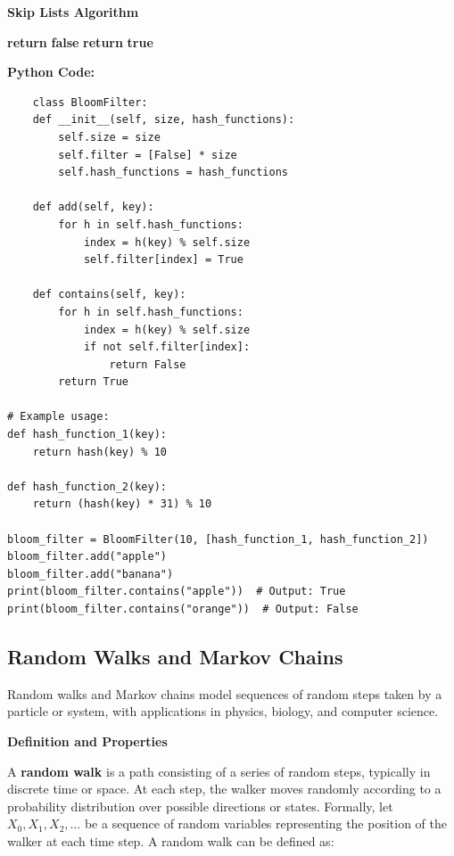 \documentclass[12pt]{book} %
\begin{document}
\textbf{Skip Lists Algorithm}
\FloatBarrier
\begin{algorithm}[H]
\caption{Bloom Filter Membership Test}
\begin{algorithmic}[1]
            \State \textbf{return} \textbf{false}
        \EndIf
    \EndFor
    \State \textbf{return} \textbf{true}
\EndFunction
\end{algorithmic}
\end{algorithm}
\FloatBarrier
\textbf{Python Code:}
\FloatBarrier
\begin{lstlisting}
    class BloomFilter:
    def __init__(self, size, hash_functions):
        self.size = size
        self.filter = [False] * size
        self.hash_functions = hash_functions

    def add(self, key):
        for h in self.hash_functions:
            index = h(key) % self.size
            self.filter[index] = True

    def contains(self, key):
        for h in self.hash_functions:
            index = h(key) % self.size
            if not self.filter[index]:
                return False
        return True

# Example usage:
def hash_function_1(key):
    return hash(key) % 10

def hash_function_2(key):
    return (hash(key) * 31) % 10

bloom_filter = BloomFilter(10, [hash_function_1, hash_function_2])
bloom_filter.add("apple")
bloom_filter.add("banana")
print(bloom_filter.contains("apple"))  # Output: True
print(bloom_filter.contains("orange"))  # Output: False
\end{lstlisting}

\subsection{Random Walks and Markov Chains}

Random walks and Markov chains model sequences of random steps taken by a particle or system, with applications in physics, biology, and computer science.

\textbf{Definition and Properties}

A \textbf{random walk} is a path consisting of a series of random steps, typically in discrete time or space. At each step, the walker moves randomly according to a probability distribution over possible directions or states. Formally, let \(X_0, X_1, X_2, \ldots\) be a sequence of random variables representing the position of the walker at each time step. A random walk can be defined as:
\end{document}
